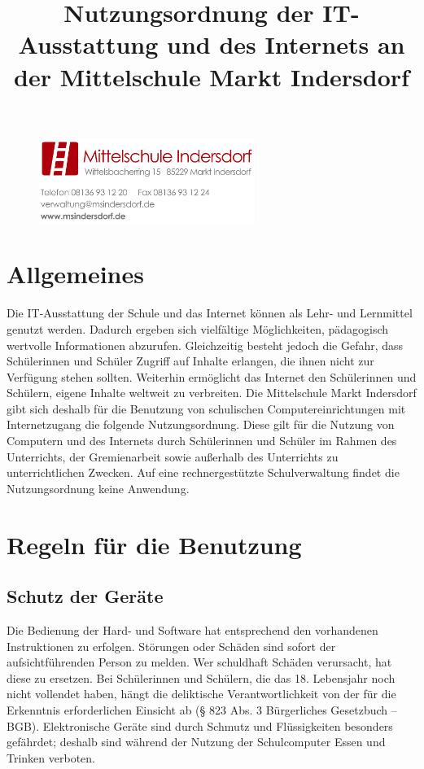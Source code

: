 \documentclass[a4paper, parskip]{scrartcl}
\title{Nutzungsordnung der IT-Ausstattung und des Internets an der
Mittelschule Markt Indersdorf}
\date{}
\begin{document}
\begin{figure}[h]
	\flushright
	\includegraphics[width=7cm]{logo_briefkopf}
	\maketitle
\end{figure}

\section{Allgemeines}
Die IT-Ausstattung der Schule und das Internet können als Lehr- und Lernmittel
genutzt werden. Dadurch ergeben sich vielfältige Möglichkeiten, pädagogisch
wertvolle Informationen abzurufen. Gleichzeitig besteht jedoch die Gefahr, dass
Schülerinnen und Schüler Zugriff auf Inhalte erlangen, die ihnen nicht zur
Verfügung stehen sollten. Weiterhin ermöglicht das Internet den Schülerinnen
und Schülern, eigene Inhalte weltweit zu verbreiten.  Die Mittelschule Markt
Indersdorf gibt sich deshalb für die Benutzung von schulischen
Computereinrichtungen mit Internetzugang die folgende Nutzungsordnung. Diese
gilt für die Nutzung von Computern und des Internets durch Schülerinnen und
Schüler im Rahmen des Unterrichts, der Gremienarbeit sowie außerhalb des
Unterrichts zu unterrichtlichen Zwecken. Auf eine rechnergestützte
Schulverwaltung findet die Nutzungsordnung keine Anwendung.

\section{Regeln für die Benutzung}
\subsection{Schutz der Geräte}
Die Bedienung der Hard- und Software hat entsprechend den vorhandenen
Instruktionen zu erfolgen. Störungen oder Schäden sind sofort der
aufsichtführenden Person zu melden. Wer schuldhaft Schäden verursacht, hat
diese zu ersetzen. Bei Schülerinnen und Schülern, die das 18. Lebensjahr noch
nicht vollendet haben, hängt die deliktische Verantwortlichkeit von der für die
Erkenntnis erforderlichen Einsicht ab (§ 823 Abs. 3 Bürgerliches Gesetzbuch –
BGB). Elektronische Geräte sind durch Schmutz und Flüssigkeiten besonders
gefährdet; deshalb sind während der Nutzung der Schulcomputer Essen und Trinken
verboten.
\end{document}
